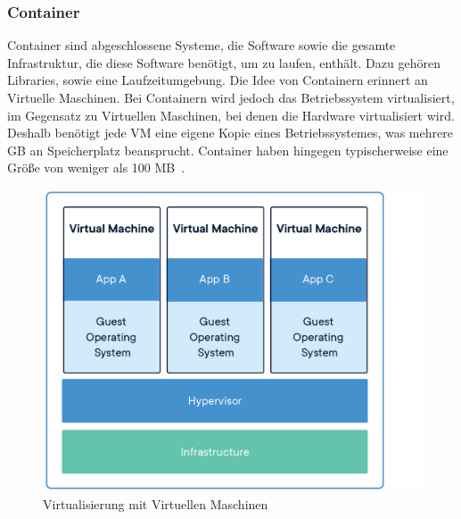 \subsubsection{Container}
 Container sind abgeschlossene Systeme, die Software sowie die gesamte Infrastruktur, die diese Software
 benötigt, um zu laufen, enthält.
 Dazu gehören Libraries, sowie eine Laufzeitumgebung.
 Die Idee von Containern erinnert an Virtuelle Maschinen.
 Bei Containern wird jedoch das Betriebssystem virtualisiert, im Gegensatz zu Virtuellen Maschinen,
 bei denen die Hardware virtualisiert wird.
 Deshalb benötigt jede VM eine eigene Kopie eines Betriebssystemes, was mehrere GB an Speicherplatz beansprucht.
 Container haben hingegen typischerweise eine Größe von weniger als 100 MB~\cite{docker-container}.

 \begin{figure}[hbt!]
     \centering
     \includegraphics[scale=0.2]{pics/docker-vm}
     \caption{Virtualisierung mit Virtuellen Maschinen~\cite{docker-container}}
 \end{figure}

